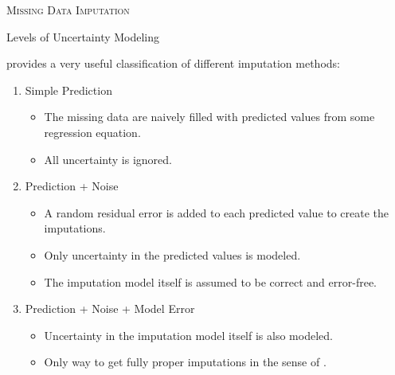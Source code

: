 \documentclass{beamer}\usepackage[]{graphicx}\usepackage[]{color}
\begin{document}
\begin{frame}{}
  
  \begin{center}
    \Huge{\textsc{Missing Data Imputation}}
  \end{center}
  
\end{frame}


\begin{frame}[shrink = 5]{Levels of Uncertainty Modeling}

  \citet{vanBuuren:2012} provides a very useful classification of different 
  imputation methods:
  \vb
  \begin{enumerate}
  \item Simple Prediction
    \begin{itemize}
    \item The missing data are naively filled with predicted values from some 
      regression equation.
    \item All uncertainty is ignored.
    \end{itemize}
    \vb
  \item Prediction + Noise
    \begin{itemize}
    \item A random residual error is added to each predicted value to create the 
      imputations.
    \item Only uncertainty in the predicted values is modeled.
    \item The imputation model itself is assumed to be correct and error-free.
    \end{itemize}
    \vb
  \item Prediction + Noise + Model Error
    \begin{itemize}
    \item Uncertainty in the imputation model itself is also modeled.
    \item Only way to get fully proper imputations in the sense of 
      \citet{rubin:1987}.
    \end{itemize}
  \end{enumerate}
  
\end{frame}

\end{document}
